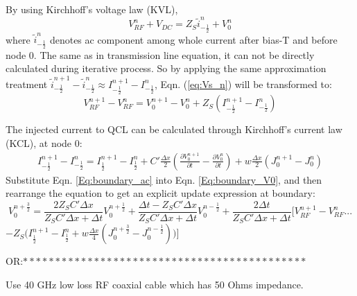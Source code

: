 \documentclass[11pt,final]{scrbook}
\begin{document}
By using Kirchhoff's voltage law (KVL), 
\begin{equation}
{ V }_{ RF }^{n}+{V}_{DC} = {Z}_{S}\widetilde{ i }_{ -\frac{1}{2} }^{ n } + {V}_{0}^{n} \label{eq:Vs_n}
\end{equation}
where $\widetilde{ i }_{ -\frac{1}{2} }^{ n }$ denotes ac component among whole current after bias-T and before node 0. The same as in transmission line equation, it can not be directly calculated during iterative process. So by applying the same approximation treatment $\tilde{ i }_{ -\frac { 1 }{ 2 }  }^{ n+1 }-\tilde{ i }_{ -\frac { 1 }{ 2 }  }^{ n }\approx{ I }_{ -\frac { 1 }{ 2 }  }^{ n+1 }-{ I }_{ -\frac { 1 }{ 2 }  }^{ n }$, Eqn. (\ref{eq:Vs_n}) will be transformed to:
\begin{equation}
{ V }_{ RF }^{ n+1 }-V_{ RF }^{ n }={ V }_{ 0 }^{ n+1 }-V_{ 0 }^{ n }+Z_{ S }( { I } _{ -\frac { 1 }{ 2 }  }^{n+1}- { I } _{ -\frac { 1 }{ 2 }  }^{ n }) \label{Eq:boundary_V0}
\end{equation}

The injected current to QCL can be calculated through Kirchhoff's current law (KCL), at node 0:
\begin{align}
{ I }_{ -\frac { 1 }{ 2 }  }^{ n+1 }-{ I }_{ -\frac { 1 }{ 2 }  }^{ n }={ I }_{ \frac { 1 }{ 2 }  }^{ n+1 }-{ I }_{ \frac { 1 }{ 2 }  }^{ n }+C'\frac { \Delta x }{ 2 } (\frac { \partial V_{ 0 }^{ n+1 } }{ \partial t } -\frac { \partial V_{ 0 }^{ n } }{ \partial t } )+w\frac { \Delta x }{ 2 } (J_{ 0 }^{ n+1 }-J_{ 0 }^{ n })\label{Eq:boundary_ac}
\end{align}
Substitute Eqn. \ref{Eq:boundary_ac} into Eqn. \ref{Eq:boundary_V0}, and then rearrange the equation to get an explicit update expression at boundary:
\begin{equation}
{ V }_{ 0 }^{ n+\frac{3}{2} }=\frac{2Z_{S}C'\Delta x}{Z_{S}C'\Delta x+\Delta t}{ V }_{ 0 }^{ n+\frac{1}{2} }+\frac{ \Delta t-Z_{S}C'\Delta x }{Z_{S}C'\Delta x+\Delta t}{ V }_{ 0 }^{ n-\frac{1}{2} }+\frac{2\Delta t}{Z_{S}C'\Delta x+\Delta t}\big [{ V }_{ RF }^{ n+1 }-V_{ RF }^{ n }...
\end{equation}
\hspace{7cm}$- Z_{S}\big ({ I }_{ \frac { 1 }{ 2 }  }^{ n+1 }-{ I }_{ \frac { 1 }{ 2 }  }^{ n }+w\frac { \Delta x }{ 4 }(J_{0}^{n+\frac{3}{2}}-J_{0}^{n-\frac{1}{2}})\big )\big ]$


OR:$********************************************$

Use 40 GHz low loss RF coaxial cable which has 50 Ohms impedance.
\end{document}
